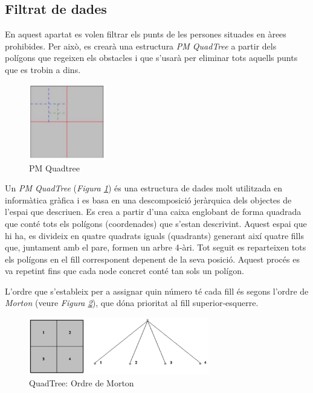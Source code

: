 \documentclass[12pt]{article}
\begin{document}
\subsection{Filtrat de dades}
En aquest apartat es volen filtrar els punts de les persones situades en àrees prohibides. Per això, es crearà una estructura \textit{PM QuadTree} a partir dels polígons que regeixen els obstacles i que s'usarà per eliminar tots aquells punts que es trobin a dins.

\begin{figure}[H]
	\centering
	\includegraphics[width=0.3\textwidth]{imatges/pm_quadtree.png}\par\vspace{1cm}
	\caption{PM Quadtree}
	\label{fig:pm_quadtree}
\end{figure}

Un \textit{PM QuadTree} (\textit{Figura \ref{fig:pm_quadtree}}) és una estructura de dades molt utilitzada en informàtica gràfica i es basa en una descomposició jeràrquica dels objectes de l’espai que descriuen. Es crea a partir d’una caixa englobant de forma quadrada que conté tots els polígons (coordenades) que s’estan descrivint. Aquest espai que hi ha, es divideix en quatre quadrats iguals (quadrants) generant així quatre fills que, juntament amb el pare, formen un arbre 4‐àri. Tot seguit es reparteixen tots els polígons en el fill corresponent depenent de la seva posició. Aquest procés es va repetint fins que cada node concret conté tan sols un polígon.

L’ordre que s’estableix per a assignar quin número té cada fill és segons l’ordre de \textit{Morton} (veure \textit{Figura \ref{fig:quadtree_ordre_de_morton}}), que dóna prioritat al fill superior‐esquerre.

\begin{figure}[H]
	\centering
	\includegraphics[width=0.7\textwidth]{imatges/quadtree_ordre_de_morton.png}\par\vspace{1cm}
	\caption{QuadTree: Ordre de Morton}
	\label{fig:quadtree_ordre_de_morton}
\end{figure}
\end{document}
